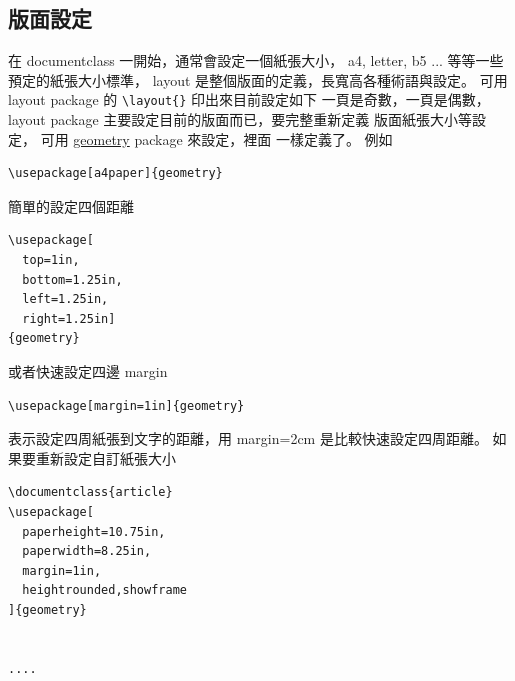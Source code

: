   \subsection{版面設定}
  在 documentclass 一開始，通常會設定一個紙張大小， a4, letter, b5 ... 等等一些
  預定的紙張大小標準， layout 是整個版面的定義，長寬高各種術語與設定。 可用
  layout package 的 \verb=\layout{}= 印出來目前設定如下
  \clearpage
  \layout{}
  一頁是奇數，一頁是偶數，layout package 主要設定目前的版面而已，要完整重新定義
  版面紙張大小等設定， 可用
  \href{https://texdoc.org/serve/geometry.pdf/0}{geometry} package 來設定，裡面
  一樣定義了。 例如
  \begin{verbatim}
\usepackage[a4paper]{geometry}
  \end{verbatim}
  簡單的設定四個距離
  \begin{verbatim}
\usepackage[
  top=1in,
  bottom=1.25in,
  left=1.25in,
  right=1.25in]
{geometry}
  \end{verbatim}
  或者快速設定四邊 margin
  \begin{verbatim}
\usepackage[margin=1in]{geometry}
  \end{verbatim}
  表示設定四周紙張到文字的距離，用 margin=2cm 是比較快速設定四周距離。
  如果要重新設定自訂紙張大小
  \begin{verbatim}
\documentclass{article}
\usepackage[
  paperheight=10.75in,
  paperwidth=8.25in,
  margin=1in,
  heightrounded,showframe
]{geometry}


....

  \end{verbatim}

